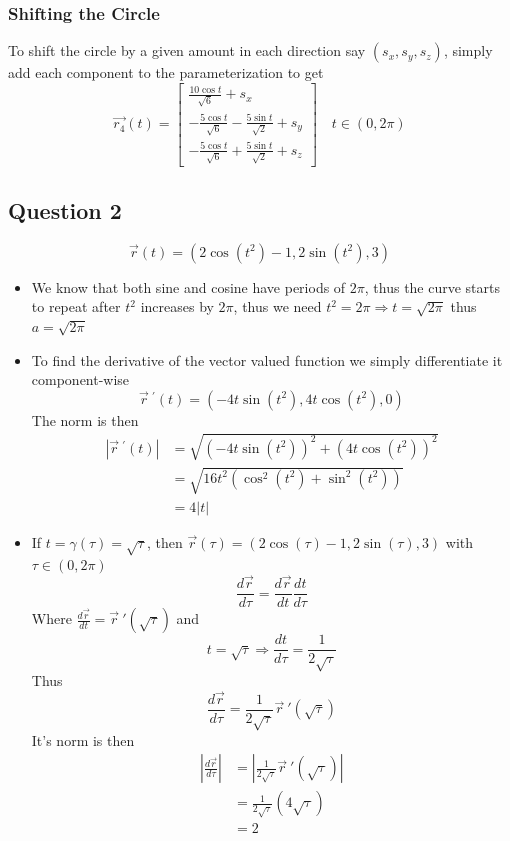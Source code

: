 \documentclass{article}
\begin{document}
\subsubsection*{Shifting the Circle}

To shift the circle by a given amount in each direction say \((s_x,s_y,s_z)\), simply add each component to the parameterization
to get
\[
\vec{r_4}(t) = \begin{bmatrix}
    \frac{10\cos t}{\sqrt{6}} + s_x \\
    -\frac{5\cos t}{\sqrt{6}} - \frac{5 \sin t}{\sqrt{2}} + s_y \\
    -\frac{5\cos t}{\sqrt{6}} + \frac{5 \sin t}{\sqrt{2}} + s_z
\end{bmatrix} \quad t \in (0,2\pi)
\]


\subsection*{Question 2}
\[
\vec{r}(t) = (2\cos(t^2) -1,2\sin(t^2), 3)
\]

\begin{itemize}
    \item We know that both sine and cosine have periods of \(2\pi\), thus the curve starts to repeat
    after \(t^2\) increases by \(2\pi\), thus we need
    \(t^2 = 2\pi \Rightarrow t = \sqrt{2\pi}\) thus \(a = \sqrt{2\pi}\)
    
    \item To find the derivative of the vector valued function we simply differentiate it component-wise
    \[
    \vec{r} \ ^{\prime}(t) = (-4t\sin(t^2), 4t\cos(t^2), 0)
    \]
    The norm is then
    \begin{align*}
        |\vec{r} \ ^{\prime}(t)| &= \sqrt{(-4t\sin(t^2))^2 + (4t\cos(t^2))^2} \\
        &= \sqrt{16t^2(\cos^2(t^2) + \sin^2(t^2))} \\
        &= 4|t|
    \end{align*}

    \item If \(t = \gamma(\tau) = \sqrt{\tau}\), then \(\vec{r}(\tau) = (2\cos(\tau) -1,2\sin(\tau), 3)\) with \(\tau \in (0,2\pi)\)
    \[
    \frac{d\vec{r}}{d\tau} = \frac{d\vec{r}}{dt} \frac{dt}{d\tau}
    \]
    Where \(\frac{d\vec{r}}{dt} = \vec{r} \ ' (\sqrt{\tau})\) and
    \[
    t = \sqrt{\tau} \Rightarrow \frac{dt}{d\tau} = \frac{1}{2\sqrt{\tau}}
    \]
    Thus
    \[
    \frac{d\vec{r}}{d\tau} = \frac{1}{2\sqrt{\tau}} \vec{r} \ '(\sqrt{\tau})
    \]
    It's norm is then 
    \begin{align*}
        \left|\frac{d\vec{r}}{d\tau}\right| &= \left|\frac{1}{2\sqrt{\tau}} \vec{r} \ '(\sqrt{\tau})\right| \\
        &= \frac{1}{2\sqrt{\tau}}(4\sqrt{\tau}) \\
        &= 2
    \end{align*}
\end{itemize}
\end{document}
